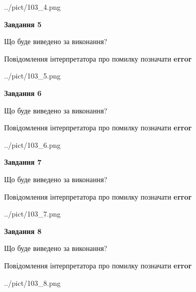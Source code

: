 \documentclass[12pt, ukrainian]{article}
\begin{document}
{\begin{center}
	{../pict/103_4.png}
\end{center}
\newpage

{\begin {center}\textbf{Завдання 5}\end {center}}\par
Що буде виведено за виконання? \par
Повідомлення інтерпретатора про помилку позначати \textbf{error}

\begin{center}
	{../pict/103_5.png}
\end{center}
\newpage

{\begin {center}\textbf{Завдання 6}\end {center}}\par
Що буде виведено за виконання? \par
Повідомлення інтерпретатора про помилку позначати \textbf{error}

\begin{center}
	{../pict/103_6.png}
\end{center}
\newpage

{\begin {center}\textbf{Завдання 7}\end {center}}\par
Що буде виведено за виконання? \par
Повідомлення інтерпретатора про помилку позначати \textbf{error}

\begin{center}
	{../pict/103_7.png}
\end{center}
\newpage

{\begin {center}\textbf{Завдання 8}\end {center}}\par
Що буде виведено за виконання? \par
Повідомлення інтерпретатора про помилку позначати \textbf{error}

\begin{center}
	{../pict/103_8.png}
\end{center}
\newpage

}
\end{document}
